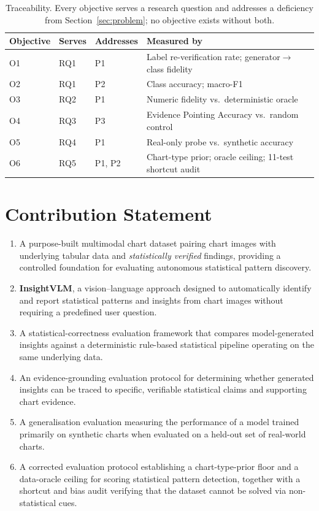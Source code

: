 \begin{table}[t]\centering\small
\caption{Traceability. Every objective serves a research question and addresses a
deficiency from Section~\ref{sec:problem}; no objective exists without both.}
\label{tab:traceability}
\begin{tabular}{llll}
\toprule
\textbf{Objective} & \textbf{Serves} & \textbf{Addresses} & \textbf{Measured by} \\
\midrule
O1 & RQ1 & P1 & Label re-verification rate; generator$\rightarrow$class fidelity \\
O2 & RQ1 & P2 & Class accuracy; macro-F1 \\
O3 & RQ2 & P1 & Numeric fidelity vs.\ deterministic oracle \\
O4 & RQ3 & P3 & Evidence Pointing Accuracy vs.\ random control \\
O5 & RQ4 & P1 & Real-only probe vs.\ synthetic accuracy \\
O6 & RQ5 & P1, P2 & Chart-type prior; oracle ceiling; 11-test shortcut audit \\
\bottomrule
\end{tabular}
\end{table}

\section{Contribution Statement}
\label{sec:contribution}

\begin{enumerate}[leftmargin=1.4em]
  \item A purpose-built multimodal chart dataset pairing chart images with
  underlying tabular data and \emph{statistically verified} findings, providing a
  controlled foundation for evaluating autonomous statistical pattern discovery.

  \item \textbf{InsightVLM}, a vision--language approach designed to
  automatically identify and report statistical patterns and insights from chart
  images without requiring a predefined user question.

  \item A statistical-correctness evaluation framework that compares
  model-generated insights against a deterministic rule-based statistical
  pipeline operating on the same underlying data.

  \item An evidence-grounding evaluation protocol for determining whether
  generated insights can be traced to specific, verifiable statistical claims and
  supporting chart evidence.

  \item A generalisation evaluation measuring the performance of a model trained
  primarily on synthetic charts when evaluated on a held-out set of real-world
  charts.

  \item A corrected evaluation protocol establishing a chart-type-prior floor and
  a data-oracle ceiling for scoring statistical pattern detection, together with a
  shortcut and bias audit verifying that the dataset cannot be solved via
  non-statistical cues.
\end{enumerate}


